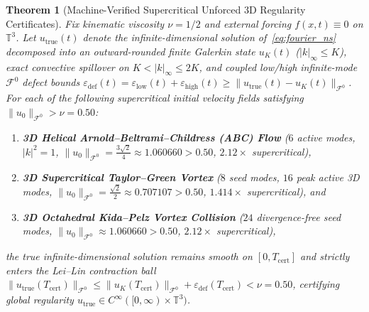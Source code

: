 \documentclass[11pt]{article}
\theoremstyle{plain}
\newtheorem{theorem}{Theorem}[section]
\theoremstyle{definition}
\begin{document}
\begin{theorem}[Machine-Verified Supercritical Unforced 3D Regularity Certificates]\label{thm:certs}
Fix kinematic viscosity $\nu = 1/2$ and external forcing $f(x,t) \equiv 0$ on $\mathbb{T}^3$. Let $u_{\mathrm{true}}(t)$ denote the infinite-dimensional solution of~\eqref{eq:fourier_ns} decomposed into an outward-rounded finite Galerkin state $u_K(t)$ ($|k|_\infty \le K$), exact convective spillover on $K < |k|_\infty \le 2K$, and coupled low/high infinite-mode $\mathcal{F}^0$ defect bounds $\varepsilon_{\mathrm{def}}(t) = \varepsilon_{\mathrm{low}}(t) + \varepsilon_{\mathrm{high}}(t) \ge \|u_{\mathrm{true}}(t) - u_K(t)\|_{\mathcal{F}^0}$. For each of the following supercritical initial velocity fields satisfying $\|u_0\|_{\mathcal{F}^0} > \nu = 0.50$:
\begin{enumerate}
  \item \textbf{3D Helical Arnold--Beltrami--Childress (ABC) Flow} ($6$ active modes, $|k|^2 = 1$, $\|u_0\|_{\mathcal{F}^0} = \frac{3\sqrt{2}}{4} \approx 1.060660 > 0.50$, $2.12\times$ supercritical),
  \item \textbf{3D Supercritical Taylor--Green Vortex} ($8$ seed modes, $16$ peak active 3D modes, $\|u_0\|_{\mathcal{F}^0} = \frac{\sqrt{2}}{2} \approx 0.707107 > 0.50$, $1.414\times$ supercritical), and
  \item \textbf{3D Octahedral Kida--Pelz Vortex Collision} ($24$ divergence-free seed modes, $\|u_0\|_{\mathcal{F}^0} \approx 1.060660 > 0.50$, $2.12\times$ supercritical),
\end{enumerate}
the true infinite-dimensional solution remains smooth on $[0, T_{\mathrm{cert}}]$ and strictly enters the Lei--Lin contraction ball $\|u_{\mathrm{true}}(T_{\mathrm{cert}})\|_{\mathcal{F}^0} \le \|u_K(T_{\mathrm{cert}})\|_{\mathcal{F}^0} + \varepsilon_{\mathrm{def}}(T_{\mathrm{cert}}) < \nu = 0.50$, certifying global regularity $u_{\mathrm{true}} \in C^\infty([0,\infty) \times \mathbb{T}^3)$.
\end{theorem}
\end{document}
